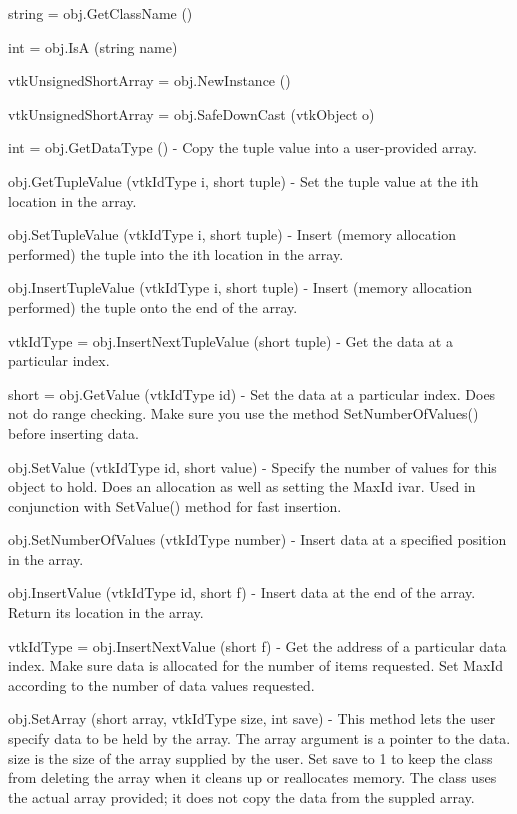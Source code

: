 \begin{DoxyItemize}
\item {\ttfamily string = obj.\-Get\-Class\-Name ()}  
\item {\ttfamily int = obj.\-Is\-A (string name)}  
\item {\ttfamily vtk\-Unsigned\-Short\-Array = obj.\-New\-Instance ()}  
\item {\ttfamily vtk\-Unsigned\-Short\-Array = obj.\-Safe\-Down\-Cast (vtk\-Object o)}  
\item {\ttfamily int = obj.\-Get\-Data\-Type ()} -\/ Copy the tuple value into a user-\/provided array.  
\item {\ttfamily obj.\-Get\-Tuple\-Value (vtk\-Id\-Type i, short tuple)} -\/ Set the tuple value at the ith location in the array.  
\item {\ttfamily obj.\-Set\-Tuple\-Value (vtk\-Id\-Type i, short tuple)} -\/ Insert (memory allocation performed) the tuple into the ith location in the array.  
\item {\ttfamily obj.\-Insert\-Tuple\-Value (vtk\-Id\-Type i, short tuple)} -\/ Insert (memory allocation performed) the tuple onto the end of the array.  
\item {\ttfamily vtk\-Id\-Type = obj.\-Insert\-Next\-Tuple\-Value (short tuple)} -\/ Get the data at a particular index.  
\item {\ttfamily short = obj.\-Get\-Value (vtk\-Id\-Type id)} -\/ Set the data at a particular index. Does not do range checking. Make sure you use the method Set\-Number\-Of\-Values() before inserting data.  
\item {\ttfamily obj.\-Set\-Value (vtk\-Id\-Type id, short value)} -\/ Specify the number of values for this object to hold. Does an allocation as well as setting the Max\-Id ivar. Used in conjunction with Set\-Value() method for fast insertion.  
\item {\ttfamily obj.\-Set\-Number\-Of\-Values (vtk\-Id\-Type number)} -\/ Insert data at a specified position in the array.  
\item {\ttfamily obj.\-Insert\-Value (vtk\-Id\-Type id, short f)} -\/ Insert data at the end of the array. Return its location in the array.  
\item {\ttfamily vtk\-Id\-Type = obj.\-Insert\-Next\-Value (short f)} -\/ Get the address of a particular data index. Make sure data is allocated for the number of items requested. Set Max\-Id according to the number of data values requested.  
\item {\ttfamily obj.\-Set\-Array (short array, vtk\-Id\-Type size, int save)} -\/ This method lets the user specify data to be held by the array. The array argument is a pointer to the data. size is the size of the array supplied by the user. Set save to 1 to keep the class from deleting the array when it cleans up or reallocates memory. The class uses the actual array provided; it does not copy the data from the suppled array.  

\end{DoxyItemize}
